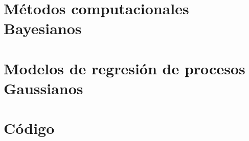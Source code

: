 \documentclass[11pt]{book}
\begin{document}

























\appendix %


\chapter{Métodos computacionales Bayesianos} \label{chapter:appendixBayesiana}




\chapter[Procesos Gaussianos]{Modelos de regresión de procesos Gaussianos} \label{chapter:appendixGaussianProcess}



%


\chapter{Código} \label{chapter:appendixCode}











\backmatter
\nocite{*}


\end{document}
